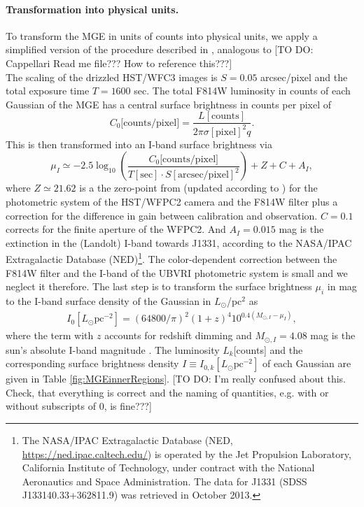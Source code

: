 \paragraph{Transformation into physical units.} To transform the MGE in units of counts into physical units, we apply a simplified version of the procedure described in \citet{Holtzman}, analogous to [TO DO: Cappellari Read me file??? How to reference this???]
\\The scaling of the drizzled HST/WFC3 images is  $S = 0.05$ arcsec/pixel and the total exposure time $T = 1600$ sec. The total F814W luminosity in counts of each Gaussian of the MGE has a central surface brightness in counts per pixel of
\begin{equation*}
C_0\text{[counts/pixel]} = \frac{L[\text{counts}]}{2\pi \sigma[\text{pixel}]^2 q}.
\end{equation*}
This is then transformed into an I-band surface brightness via
\begin{equation}
\mu_I \simeq -2.5 \log_{10}\left( \frac{C_0\text{[counts/pixel]}}{T[\text{sec}] \cdot S[\text{arcsec/pixel}]^2}\right) + Z + C + A_I, \label{eq:muI_}
\end{equation}
where $Z\simeq21.62$ is a the zero-point from \citet{Holtzman}  (updated according to \citet{Dolphin,DolphinNew}) for the photometric system of the HST/WFPC2 camera and the F814W filter plus a correction for the difference in gain between calibration and observation. $C= 0.1$ corrects for the finite aperture of the WFPC2. And $A_I =0.015$ mag  is the extinction in the (Landolt) I-band towards J1331, according to the NASA/IPAC Extragalactic Database (NED)\footnote{The NASA/IPAC Extragalactic Database (NED, \url{https://ned.ipac.caltech.edu/}) is operated by the Jet Propulsion Laboratory, California Institute of Technology, under contract with the National Aeronautics and Space Administration. The data for J1331 (SDSS J133140.33+362811.9) was retrieved in October 2013.}. The color-dependent correction between the F814W filter and the I-band of the UBVRI photometric system is  small \citep{Holtzman} and we neglect it therefore. The last step is to transform the surface brightness $\mu_i$ in mag to the I-band surface density of the Gaussian in $L_\odot$/pc$^2$ as
\begin{eqnarray*}
I_0[L_\odot \text{pc}^{-2}] = \left( 64800/\pi\right)^2 \left(1+z \right)^4 10^{0.4\left(M_{\odot,I}-\mu_I \right)},
\end{eqnarray*}
where the term with $z$ accounts for redshift dimming and $M_{\odot,I}=4.08$ mag is the sun's absolute I-band magnitude \citep{1998gaas.book.....B}. The luminosity $L_k$[counts] and the corresponding surface brightness density $I \equiv I_{0,k}[L_\odot \text{pc}^{-2}]$ of each Gaussian are given in Table \ref{fig:MGEinnerRegions}. [TO DO: I'm really confused about this. Check, that everything is correct and the naming of quantities, e.g. with or without subscripts of 0, is fine???]

